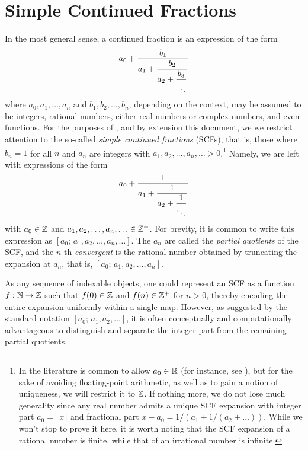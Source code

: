 \section{Simple Continued Fractions\texorpdfstring{\protect\footnotemark}{}}


In the most general sense, a continued fraction is an expression of the form
\[
  a_0 + \cfrac{b_1}{a_1 + \cfrac{b_2}{a_2 + \cfrac{b_3}{\ddots}}}
\]
where $a_0, a_1, \ldots, a_n$ and $b_1, b_2, \ldots, b_n$, depending on the context, 
may be assumed to be integers, rational numbers, either real numbers or complex numbers,
and even functions. For the purposes of \catena, and by extension this document, we 
we restrict attention to the so-called \textit{simple continued fractions} (SCFs), that is, those 
where $b_n = 1$ for all $n$ and $a_n$ are integers with $a_1, a_2, \ldots, a_n, \ldots > 0$.\footnote{
    In the literature is common to allow $a_0 \in \R$ (for instance, see \cite{khinchin1964}), 
    but for the sake of avoiding floating-point arithmetic, as well as to gain a notion of uniqueness,
    we will restrict it to $\Z$. If nothing more, we do not lose much generality since any real number 
    admits a unique SCF expansion with integer part $a_0 = \lfloor x \rfloor$ and fractional part 
    $x - a_0 = 1/(a_1 + 1/(a_2 + \ldots))$. While we won't stop to prove it here, 
    it is worth noting that the SCF expansion of a rational number is finite, while that of an 
    irrational number is infinite.
} Namely, we are left with expressions of the form
\[
  a_0 + \cfrac{1}{a_1 + \cfrac{1}{a_2 + \cfrac{1}{\ddots}}}
\]
with $a_0 \in \Z$ and $a_1, a_2, \ldots, a_n, \ldots \in \Zp$. For brevity, it is common to write this 
expression as $[a_0;\, a_1, a_2, \ldots, a_n, \ldots]$. The $a_n$ are called the \textit{partial quotients} 
of the SCF, and the $n$-th \textit{convergent} is the rational number obtained by truncating the 
expansion at $a_n$, that is, $[a_0;\, a_1, a_2, \ldots, a_n]$.

As any sequence of indexable objects, one could represent an SCF as a function $f: \N \to \Z$ such that 
$f(0) \in \Z$ and $f(n) \in \Zp$ for $n > 0$, thereby encoding the entire expansion uniformly within a 
single map. However, as suggested by the standard notation $[a_0;\, a_1, a_2, \ldots]$, it is often 
conceptually and computationally advantageous to distinguish and separate the integer part from the 
remaining partial quotients.

